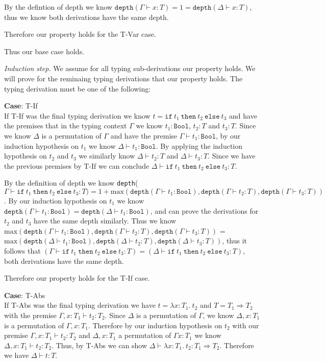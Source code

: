 \documentclass[12pt, fleqn]{article}
\begin{document}
By the defintion of depth we know $\texttt{depth}(\Gamma \vdash x : T) = 1 = 
\texttt{depth}(\Delta \vdash x : T)$, thus we know both derivations have the same depth.

Therefore our property holds for the T-Var case.

\medskip
Thus our base case holds.

\medskip
\emph{Induction step.} We assume for all typing sub-derivations our property holds. We will prove for the reminaing typing derivations
that our property holds. The typing derivation must be one of the following:

\medskip
\textbf{Case}: T-If\\
If T-If was the final typing derivation we know $t = \texttt{if}\:t_1\:\texttt{then}\:t_2\:\texttt{else}\:t_3$ and
have the premises that in the typing context $\Gamma$ we know $t_1 : \texttt{Bool}$, $t_2 : T$ and $t_3 : T$. Since we
know $\Delta$ is a permutation of $\Gamma$ and have the premise $\Gamma \vdash t_1 : \texttt{Bool}$, by our 
induction hypothesis on $t_1$ we know $\Delta \vdash t_1 : \texttt{Bool}$. By applying the induction hypothesis on $t_2$ and
$t_3$ we similarly know $\Delta \vdash t_2 : T$ and $\Delta \vdash t_3 : T$. Since we have the previous premises by
T-If we can conclude $\Delta \vdash \texttt{if}\:t_1\:\texttt{then}\:t_2\:\texttt{else}\:t_3 : T$. 

By the definition of depth we know \texttt{depth}($\Gamma \vdash \texttt{if}\:t_1\:\texttt{then}\:t_2\:\texttt{else}\:t_3 : T) = 1 + 
\textrm{max}(\texttt{depth}(\Gamma \vdash t_1 : \texttt{Bool}), \texttt{depth}(\Gamma \vdash t_2 : T), \texttt{depth}(\Gamma \vdash t_3 : T))$.
By our induction hypothesis on $t_1$ we know $\texttt{depth}(\Gamma \vdash t_1 : \texttt{Bool}) = \texttt{depth}(\Delta \vdash t_1 : \texttt{Bool})$,
and can prove the derivations for $t_2$ and $t_3$ have the same depth similarly. Thus we know 
$\textrm{max}(\texttt{depth}(\Gamma \vdash t_1 : \texttt{Bool}), \texttt{depth}(\Gamma \vdash t_2 : T), \texttt{depth}(\Gamma \vdash t_3 : T))$
= $\textrm{max}(\texttt{depth}(\Delta \vdash t_1 : \texttt{Bool}), \texttt{depth}(\Delta \vdash t_2 : T), \texttt{depth}(\Delta \vdash t_3 : T))$,
thus it follows that $(\Gamma \vdash \texttt{if}\:t_1\:\texttt{then}\:t_2\:\texttt{else}\:t_3 : T) = 
(\Delta \vdash \texttt{if}\:t_1\:\texttt{then}\:t_2\:\texttt{else}\:t_3 : T)$, both derivations have the same depth.

Therefore our property holds for the T-If case.

\medskip
\textbf{Case}: T-Abs\\
If T-Abs was the final typing derivation we have $t = \lambda x: T_1.\:t_2$ and $T = T_1 \Rightarrow T_2$ with the premise
$\Gamma, x: T_1 \vdash t_2 : T_2$. Since $\Delta$ is a permutation of $\Gamma$, we know $\Delta, x: T_1$ is a permutation of
$\Gamma, x: T_1$. Therefore by our induction hypothesis on $t_2$ with our premise $\Gamma, x: T_1 \vdash t_2 : T_2$
and $\Delta, x: T_1$ a permutation of $\Gamma x: T_1$ we know $\Delta, x: T_1 \vdash t_2 : T_2$. Thus, by T-Abs we can show
$\Delta \vdash \lambda x : T_1.\: t_2 : T_1 \Rightarrow T_2$. Therefore we have $\Delta \vdash t : T$.
\end{document}
